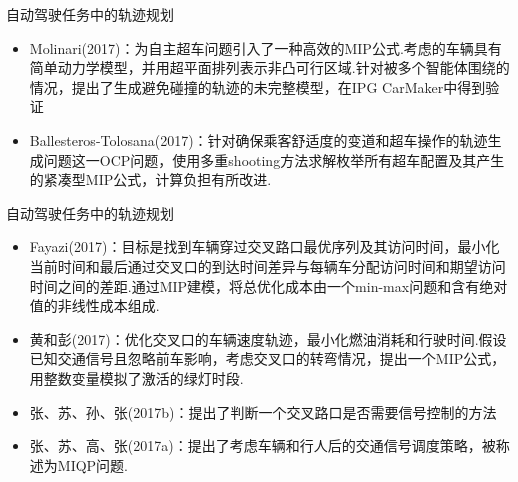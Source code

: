 \documentclass[notheorems,11pt]{beamer}
\theoremstyle{plain}
\numberwithin{theorem}{section}
\numberwithin{lemma}{section}
\numberwithin{corollary}{section}
\theoremstyle{example}
\begin{document}
\begin{frame}{自动驾驶任务中的轨迹规划}
  \begin{itemize}
    \item Molinari(2017)：为自主超车问题引入了一种高效的MIP公式.考虑的车辆具有简单动力学模型，并用超平面排列表示非凸可行区域.针对被多个智能体围绕的情况，提出了生成避免碰撞的轨迹的未完整模型，在IPG CarMaker中得到验证
    \item Ballesteros-Tolosana(2017)：针对确保乘客舒适度的变道和超车操作的轨迹生成问题这一OCP问题，使用多重shooting方法求解枚举所有超车配置及其产生的紧凑型MIP公式，计算负担有所改进.
  \end{itemize}
\end{frame}

\begin{frame}{自动驾驶任务中的轨迹规划}
  \begin{itemize}
    \item Fayazi(2017)：目标是找到车辆穿过交叉路口最优序列及其访问时间，最小化当前时间和最后通过交叉口的到达时间差异与每辆车分配访问时间和期望访问时间之间的差距.通过MIP建模，将总优化成本由一个min-max问题和含有绝对值的非线性成本组成.
    \item 黄和彭(2017)：优化交叉口的车辆速度轨迹，最小化燃油消耗和行驶时间.假设已知交通信号且忽略前车影响，考虑交叉口的转弯情况，提出一个MIP公式，用整数变量模拟了激活的绿灯时段.
    \item 张、苏、孙、张(2017b)：提出了判断一个交叉路口是否需要信号控制的方法
    \item 张、苏、高、张(2017a)：提出了考虑车辆和行人后的交通信号调度策略，被称述为MIQP问题.
  \end{itemize}
\end{frame}
\end{document}
